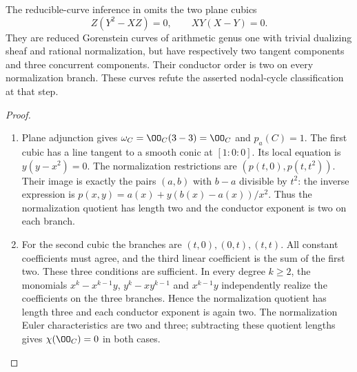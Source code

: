 \begin{proposition}\hypertarget{tag-02WL}{}\label{night:P4.14}\label{stmt:P4.14}

The reducible-curve inference in \cite[proof of Proposition~7.3,
p.~16 of the attached-source edition]{CDP20} omits the two plane cubics
\[
 Z(Y^2-XZ)=0,\qquad XY(X-Y)=0.
\]
They are reduced Gorenstein curves of arithmetic genus one with
trivial dualizing sheaf and rational normalization, but have
respectively two tangent components and three concurrent
components. Their conductor order is two on every normalization
branch. These curves refute the asserted nodal-cycle
classification at that step.
\end{proposition}
\begin{proof}

\begin{enumerate}[leftmargin=*]
\item Plane adjunction gives $\omega_C=\OO_C(3-3)=\OO_C$ and
$p_a(C)=1$. The first cubic has a line tangent to a smooth
conic at $[1:0:0]$. Its local equation is $y(y-x^2)=0$.
The normalization restrictions are $(p(t,0),p(t,t^2))$.
Their image is exactly the pairs $(a,b)$ with $b-a$ divisible
by $t^2$: the inverse expression is
$p(x,y)=a(x)+y(b(x)-a(x))/x^2$. Thus the normalization
quotient has length two and the conductor exponent is two on
each branch.

\item For the second cubic the branches are $(t,0),(0,t),(t,t)$.
All constant coefficients must agree, and the third linear
coefficient is the sum of the first two. These three conditions
are sufficient. In every degree $k\ge2$, the monomials
$x^k-x^{k-1}y$, $y^k-xy^{k-1}$ and $x^{k-1}y$ independently
realize the coefficients on the three branches. Hence the
normalization quotient has length three and each conductor
exponent is again two. The normalization Euler characteristics
are two and three; subtracting these quotient lengths gives
$\chi(\OO_C)=0$ in both cases.


\end{enumerate}
\end{proof}
